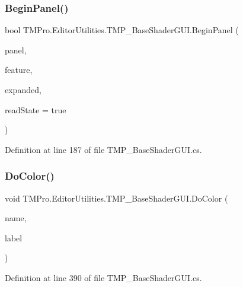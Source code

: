 \subsubsection{\texorpdfstring{BeginPanel()}{BeginPanel()}\hspace{0.1cm}{\footnotesize\ttfamily [2/2]}}
{\footnotesize\ttfamily bool T\+M\+Pro.\+Editor\+Utilities.\+T\+M\+P\+\_\+\+Base\+Shader\+G\+U\+I.\+Begin\+Panel (\begin{DoxyParamCaption}\item[{string}]{panel,  }\item[{\mbox{\hyperlink{class_t_m_pro_1_1_editor_utilities_1_1_t_m_p___base_shader_g_u_i_1_1_shader_feature}{Shader\+Feature}}}]{feature,  }\item[{bool}]{expanded,  }\item[{bool}]{read\+State = {\ttfamily true} }\end{DoxyParamCaption})\hspace{0.3cm}{\ttfamily [protected]}}



Definition at line 187 of file T\+M\+P\+\_\+\+Base\+Shader\+G\+U\+I.\+cs.

\mbox{\label{class_t_m_pro_1_1_editor_utilities_1_1_t_m_p___base_shader_g_u_i_a7f787e8efc629d8f87d64cf39b3b90ea}} 
\subsubsection{\texorpdfstring{DoColor()}{DoColor()}}
{\footnotesize\ttfamily void T\+M\+Pro.\+Editor\+Utilities.\+T\+M\+P\+\_\+\+Base\+Shader\+G\+U\+I.\+Do\+Color (\begin{DoxyParamCaption}\item[{string}]{name,  }\item[{string}]{label }\end{DoxyParamCaption})\hspace{0.3cm}{\ttfamily [protected]}}



Definition at line 390 of file T\+M\+P\+\_\+\+Base\+Shader\+G\+U\+I.\+cs.

\mbox{\label{class_t_m_pro_1_1_editor_utilities_1_1_t_m_p___base_shader_g_u_i_a4a49537dbf39132cc76f9f7aa54b3ccb}} 
